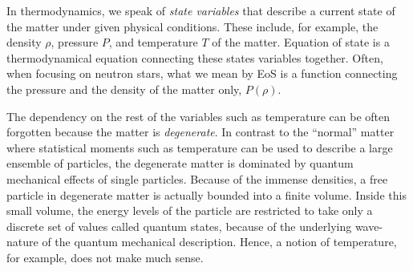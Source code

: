 

In thermodynamics, we speak of \emph{state variables} that describe a current state of the matter under given physical conditions.
These include, for example, the density $\rho$, pressure $P$, and temperature $T$ of the matter.
Equation of state is a thermodynamical equation connecting these states variables together.
Often, when focusing on neutron stars, what we mean by EoS is a function connecting the pressure and the density of the matter only, $P(\rho)$.

The dependency on the rest of the variables such as temperature can be often forgotten because the matter is \emph{degenerate}. %
In contrast to the ``normal'' matter where statistical moments such as temperature can be used to describe a large ensemble of particles, the degenerate matter is dominated by quantum mechanical effects of single particles.
Because of the immense densities, a free particle in degenerate matter is actually bounded into a finite volume.
Inside this small volume, the energy levels of the particle are restricted to take only a discrete set of values called quantum states, because of the underlying wave-nature of the quantum mechanical description.
Hence, a notion of temperature, for example, does not make much sense.

